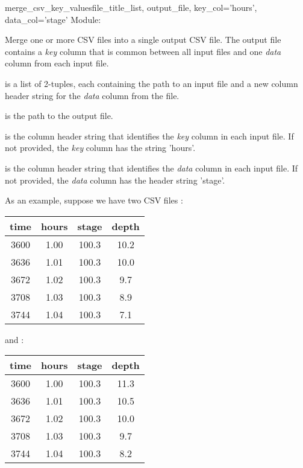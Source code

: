 \documentclass{manual}
\begin{document}
\begin{methoddesc}{merge_csv_key_values}{file_title_list,
                                         output_file,
                                         key_col='hours',
                                         data_col='stage'}
Module: 

Merge one or more CSV files into a single output CSV file.  The output file contains a \emph{key}
column that is common between all input files and one \emph{data} column from each input file.

 is a list of 2-tuples, each containing the path to an input file and a
new column header string for the \emph{data} column from the file.

 is the path to the output file.

 is the column header string that identifies the \emph{key} column in each
input file.  If not provided, the \emph{key} column has the string 'hours'.

 is the column header string that identifies the \emph{data} column in each
input file.  If not provided, the \emph{data} column has the header string 'stage'.

As an example, suppose we have two CSV files :

\begin{table}[htp]
  \begin{center}
    \begin{tabular}{|cccc|}
      \hline
      time & hours & stage & depth \\
      \hline
      3600 & 1.00 & 100.3 & 10.2 \\
      3636 & 1.01 & 100.3 & 10.0 \\
      3672 & 1.02 & 100.3 &  9.7 \\
      3708 & 1.03 & 100.3 &  8.9 \\
      3744 & 1.04 & 100.3 &  7.1 \\
      \hline
    \end{tabular}
  \end{center}
\end{table}

and :

\begin{table}[htp]
  \begin{center}
    \begin{tabular}{|cccc|}
      \hline
      time & hours & stage & depth \\
      \hline
      3600 & 1.00 & 100.3 & 11.3 \\
      3636 & 1.01 & 100.3 & 10.5 \\
      3672 & 1.02 & 100.3 & 10.0 \\
      3708 & 1.03 & 100.3 &  9.7 \\
      3744 & 1.04 & 100.3 &  8.2 \\
      \hline
    \end{tabular}
  \end{center}
\end{table}


\end{methoddesc}
\end{document}
